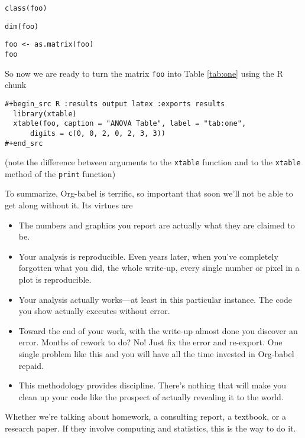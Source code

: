 \documentclass[11pt]{article}
\begin{document}
\begin{verbatim}
class(foo)
\end{verbatim}

\begin{verbatim}
dim(foo)
\end{verbatim}

\begin{verbatim}
foo <- as.matrix(foo)
foo
\end{verbatim}

\pagebreak

So now we are ready to turn the matrix \texttt{foo} into Table \ref{tab:one}
using the R chunk
\begin{verbatim}
#+begin_src R :results output latex :exports results
  library(xtable)
  xtable(foo, caption = "ANOVA Table", label = "tab:one",
      digits = c(0, 0, 2, 0, 2, 3, 3))
#+end_src
\end{verbatim}


(note the difference between arguments to the \texttt{xtable} function and to
the \texttt{xtable} method of the \texttt{print} function)

To summarize, Org-babel is terrific, so important that soon we'll not
be able to get along without it.  Its virtues are
\begin{itemize}
\item The numbers and graphics you report are actually what they
are claimed to be.
\item Your analysis is reproducible.  Even years later, when you've
completely forgotten what you did, the whole write-up, every single
number or pixel in a plot is reproducible.
\item Your analysis actually works---at least in this particular instance.
The code you show actually executes without error.
\item Toward the end of your work, with the write-up almost done you
discover an error.  Months of rework to do?  No!  Just fix the error
and re-export.  One single problem like this and you will have all
the time invested in Org-babel repaid.
\item This methodology provides discipline.  There's nothing that will make
you clean up your code like the prospect of actually revealing it to
the world.
\end{itemize}

Whether we're talking about homework, a consulting report, a textbook,
or a research paper.  If they involve computing and statistics, this
is the way to do it.
\end{document}
